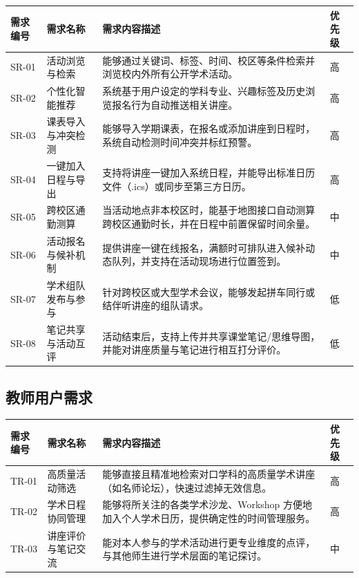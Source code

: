 \documentclass[UTF8,a4paper,12pt,fontset=none]{ctexrep}
\begin{document}
\begingroup
\small
\begin{longtable}{|>{\raggedright\arraybackslash}p{}|>{\raggedright\arraybackslash}p{}|>{\raggedright\arraybackslash}p{}|>{\raggedright\arraybackslash}p{}|}
\hline
\textbf{需求编号} & \textbf{需求名称} & \textbf{需求内容描述} & \textbf{优先级} \\
\hline
SR-01 & 活动浏览与检索 & 能够通过关键词、标签、时间、校区等条件检索并浏览校内外所有公开学术活动。 & 高 \\
\hline
SR-02 & 个性化智能推荐 & 系统基于用户设定的学科专业、兴趣标签及历史浏览报名行为自动推送相关讲座。 & 高 \\
\hline
SR-03 & 课表导入与冲突检测 & 能够导入学期课表，在报名或添加讲座到日程时，系统自动检测时间冲突并标红预警。 & 高 \\
\hline
SR-04 & 一键加入日程与导出 & 支持将讲座一键加入系统日程，并能导出标准日历文件（.ics）或同步至第三方日历。 & 高 \\
\hline
SR-05 & 跨校区通勤测算 & 当活动地点非本校区时，能基于地图接口自动测算跨校区通勤时长，并在日程中前置保留时间余量。 & 中 \\
\hline
SR-06 & 活动报名与候补机制 & 提供讲座一键在线报名，满额时可排队进入候补动态队列，并支持在活动现场进行位置签到。 & 中 \\
\hline
SR-07 & 学术组队发布与参与 & 针对跨校区或大型学术会议，能够发起拼车同行或结伴听讲座的组队请求。 & 低 \\
\hline
SR-08 & 笔记共享与活动互评 & 活动结束后，支持上传并共享课堂笔记/思维导图，并能对讲座质量与笔记进行相互打分评价。 & 低 \\
\hline
\end{longtable}
\endgroup

\subsection{教师用户需求}

\begingroup
\small
\begin{longtable}{|>{\raggedright\arraybackslash}p{}|>{\raggedright\arraybackslash}p{}|>{\raggedright\arraybackslash}p{}|>{\raggedright\arraybackslash}p{}|}
\hline
\textbf{需求编号} & \textbf{需求名称} & \textbf{需求内容描述} & \textbf{优先级} \\
\hline
TR-01 & 高质量活动筛选 & 能够直接且精准地检索对口学科的高质量学术讲座（如名师论坛），快速过滤掉无效信息。 & 高 \\
\hline
TR-02 & 学术日程协同管理 & 能够将所关注的各类学术沙龙、Workshop 方便地加入个人学术日历，提供确定性的时间管理服务。 & 高 \\
\hline
TR-03 & 讲座评价与笔记交流 & 能对本人参与的学术活动进行更专业维度的点评，与其他师生进行学术层面的笔记探讨。 & 中 \\
\hline
\end{longtable}
\endgroup
\end{document}
